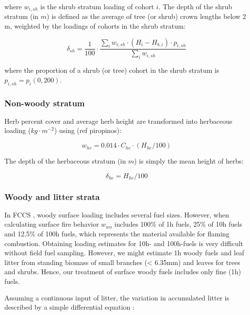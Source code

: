 \documentclass[]{book}
\begin{document}
where \(w_{i,sh}\) is the shrub stratum loading of cohort \(i\). The
depth of the shrub stratum (in \(m\)) is defined as the average of tree
(or shrub) crown lengths below 2 m, weighted by the loadings of cohorts
in the shrub stratum:

\begin{equation}
\delta_{sh} = \frac{1}{100}\cdot \frac{\sum_{i}{w_{i,sh}\cdot (H_i - H_{b,i})\cdot p_{i,sh} }}{\sum_{i}{w_{i,sh}}}
\end{equation}

where the proportion of a shrub (or tree) cohort in the shrub stratum is
\(p_{i,sh}=p_{i}(0,200)\).

\subsubsection{Non-woody stratum}\label{non-woody-stratum}

Herb percent cover and average herb height are transformed into
herbaceous loading (\(kg\cdot m^{-2}\)) using (ref piropinos):

\begin{equation}
w_{he} = 0.014 \cdot C_{he} \cdot (H_{he}/100)
\end{equation}

The depth of the herbaceous stratum (in \(m\)) is simply the mean height
of herbs:

\begin{equation}
\delta_{he} = H_{he}/100
\end{equation}

\subsubsection{Woody and litter strata}\label{woody-and-litter-strata}

In FCCS \citep{Prichard2013}, woody surface loading includes several
fuel sizes. However, when calculating surface fire behavior \(w_{wo}\)
includes 100\% of 1h fuels, 25\% of 10h fuels and 12.5\% of 100h fuels,
which represents the material available for flaming combustion.
Obtaining loading estimates for 10h- and 100h-fuels is very difficult
without field fuel sampling. However, we might estimate 1h woody fuels
and leaf litter from standing biomass of small branches (\textless{}
6.35mm) and leaves for trees and shrubs. Hence, our treatment of surface
woody fuels includes only fine (1h) fuels.

Assuming a continuous input of litter, the variation in accumulated
litter is described by a simple differential equation \citep{Birk1980}:
\end{document}
